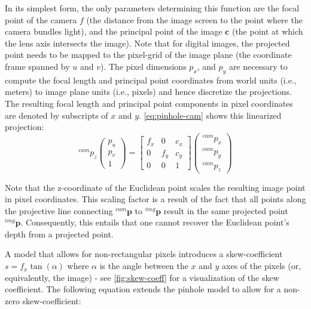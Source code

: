 \documentclass[headsepline, hidelinks, footsepline, footinclude=false, oneside, fontsize=11pt, paper=a4, listof=totoc, bibliography=totoc]{scrbook}
\begin{document}
In its simplest form, the only parameters determining this function are the focal point of the camera \(f\) (the distance from the image screen to the point where the camera bundles light), and the principal point of the image \(\mathbf{c}\) (the point at which the lens axis intersects the image). 
Note that for digital images, the projected point needs to be mapped to the pixel-grid of the image plane (the coordinate frame spanned by \(u\) and \(v\)). 
The pixel dimensions \(p_x\), and \(p_y\) are necessary to compute the focal length and principal point coordinates from world units (i.e., meters) to image plane units (i.e., pixels) and hence discretize the projections. 
The resulting focal length and principal point components in pixel coordinates are denoted by subscripts of \(x\) and \(y\).
\cref{eq:pinhole-cam} shows this linearized projection:
\begin{equation}
\label{eq:pinhole-cam}
{}^{cam}p_z  \begin{pmatrix}p_u \\ p_v \\ 1 \end{pmatrix} = \begin{bmatrix}f_x & 0 & c_x \\ 0 & f_y & c_y \\ 0 & 0 & 1 \end{bmatrix}\begin{pmatrix}{}^{cam}p_x \\ {}^{cam}p_y \\ {}^{cam}p_z \end{pmatrix}
\end{equation}

Note that the z-coordinate of the Euclidean point scales the resulting image point in pixel coordinates. This scaling factor is a result of the fact that all points along the projective line connecting \({}^{cam}\mathbf{p}\) to \({}^{img}\mathbf{p}\) result in the same projected point \({}^{img}\mathbf{p}\). 
Consequently, this entails that one cannot recover the Euclidean point's depth from a projected point.

A model that allows for non-rectangular pixels introduces a skew-coefficient \(s=f_x\tan(\alpha)\) where \(\alpha\) is the angle between the \(x\) and \(y\) axes of the pixels (or, equivalently, the image) - see \cref{fig:skew-coeff} for a visualization of the skew coefficient.
The following equation extends the pinhole model to allow for a non-zero skew-coefficient:
\end{document}
